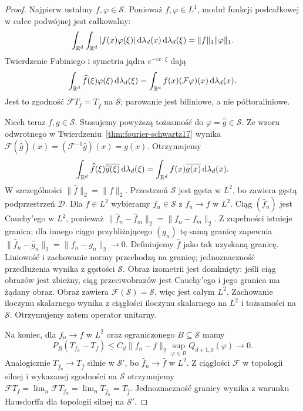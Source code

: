 \begin{proof}
Najpierw ustalmy $f,\varphi\in\mathcal S$.
Ponieważ $f,\varphi\in L^1$, moduł funkcji
podcałkowej w całce podwójnej jest całkowalny:
\[
 \int_{\mathbb R^d}\int_{\mathbb R^d}|f(x)\varphi(\xi)|
 \,\mathrm d\lambda_d(x)\,\mathrm d\lambda_d(\xi)
 =\|f\|_1\|\varphi\|_1.
\]
Twierdzenie Fubiniego i symetria jądra
$e^{-ix\cdot\xi}$ dają
\[
 \int_{\mathbb R^d}\widehat f(\xi)\varphi(\xi)
 \,\mathrm d\lambda_d(\xi)
 =\int_{\mathbb R^d}f(x)(\mathcal F\varphi)(x)
 \,\mathrm d\lambda_d(x).
\]
Jest to zgodność $\mathcal F T_f=T_{\widehat f}$ na
$\mathcal S$; parowanie jest biliniowe, a nie
półtoraliniowe.

Niech teraz $f,g\in\mathcal S$. Stosujemy powyższą
tożsamość do $\varphi=\overline{\widehat g}\in\mathcal S$.
Ze wzoru odwrotnego w Twierdzeniu~\ref{thm:fourier-schwartz17}
wynika
$\mathcal F(\overline{\widehat g})(x)
=\overline{(\mathcal F^{-1}\widehat g)(x)}
=\overline{g(x)}$.
Otrzymujemy
\[
 \int_{\mathbb R^d}\widehat f(\xi)\overline{\widehat g(\xi)}
 \,\mathrm d\lambda_d(\xi)
 =\int_{\mathbb R^d}f(x)\overline{g(x)}\,\mathrm d\lambda_d(x).
\]
W szczególności $\|\widehat f\|_2=\|f\|_2$.
Przestrzeń $\mathcal S$ jest gęsta w $L^2$, bo zawiera
gęstą podprzestrzeń $\mathcal D$. Dla $f\in L^2$
wybieramy $f_n\in\mathcal S$ z $f_n\to f$ w $L^2$.
Ciąg $(\widehat f_n)$ jest Cauchy'ego w $L^2$,
ponieważ $\|\widehat f_n-\widehat f_m\|_2
=\|f_n-f_m\|_2$. Z zupełności istnieje granica;
dla innego ciągu przybliżającego $(g_n)$ tę samą granicę
zapewnia $\|\widehat f_n-\widehat g_n\|_2
=\|f_n-g_n\|_2\to0$. Definiujemy $\widehat f$ jako
tak uzyskaną granicę. Liniowość i zachowanie normy
przechodzą na granicę; jednoznaczność przedłużenia
wynika z gęstości $\mathcal S$.
Obraz izometrii jest domknięty: jeśli ciąg obrazów
jest zbieżny, ciąg przeciwobrazów jest Cauchy'ego i
jego granica ma żądany obraz. Obraz zawiera
$\mathcal F(\mathcal S)=\mathcal S$, więc jest całym
$L^2$. Zachowanie iloczynu skalarnego wynika z ciągłości
iloczynu skalarnego na $L^2$ i tożsamości na $\mathcal S$.
Otrzymujemy zatem operator unitarny.

Na koniec, dla $f_n\to f$ w $L^2$ oraz ograniczonego
$B\subseteq\mathcal S$ mamy
\[
 P_B(T_{f_n}-T_f)
 \le C_d\|f_n-f\|_2
 \sup_{\varphi\in B}Q_{d+1,0}(\varphi)\longrightarrow0.
\]
Analogicznie $T_{\widehat f_n}\to T_{\widehat f}$ silnie
w $\mathcal S'$, bo $\widehat f_n\to\widehat f$ w $L^2$.
Z ciągłości $\mathcal F$ w topologii silnej i
wykazanej zgodności na $\mathcal S$ otrzymujemy
$\mathcal FT_f=\lim_n\mathcal FT_{f_n}
=\lim_nT_{\widehat f_n}=T_{\widehat f}$.
Jednoznaczność granicy wynika z warunku Hausdorffa
dla topologii silnej na $\mathcal S'$.
\end{proof}

